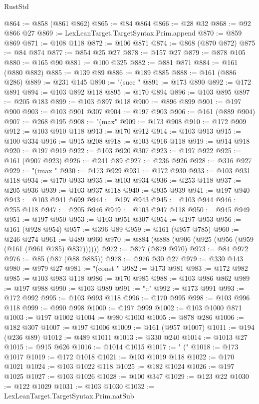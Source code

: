 \begin{lexlean}{RustStd}
\begin{coremodule}
{\begin{coremodule}
{{{{{{{{{{{{{{{{{{{{{{{{{{@864 := @858 (@861 @862)
@865 := @84 @864
@866 := @28 @32
@868 := @92 @866 @27
@869 := LexLeanTarget.TargetSyntax.Prim.append
@870 := @859 @869
@871 := @108 @118
@872 := @106 @871
@874 := @868 (@870 @872)
@875 := @84 @874
@877 := @854 @25 @27
@878 := @157 @27
@879 := @878 @105
@880 := @165 @90
@881 := @100 @325
@882 := @881 @871
@884 := @161 (@880 @882)
@885 := @139 @89
@886 := @189 @885
@888 := @161 (@886 @286)
@889 := @231 @145
@890 := "(succ "
@891 := @173 @890
@892 := @172 @891
@894 := @103 @892 @118
@895 := @170 @894
@896 := @103 @895
@897 := @205 @183
@899 := @103 @897 @118
@900 := @896 @899
@901 := @197 @900
@903 := @103 @901 @307
@904 := @197 @903
@906 := @161 (@889 @904)
@907 := @268 @195
@908 := "(max"
@909 := @173 @908
@910 := @172 @909
@912 := @103 @910 @118
@913 := @170 @912
@914 := @103 @913
@915 := @100 @334
@916 := @915 @208
@918 := @103 @916 @118
@919 := @914 @918
@920 := @197 @919
@922 := @103 @920 @307
@923 := @197 @922
@925 := @161 (@907 @923)
@926 := @241 @89
@927 := @236 @926
@928 := @316 @927
@929 := "(imax "
@930 := @173 @929
@931 := @172 @930
@933 := @103 @931 @118
@934 := @170 @933
@935 := @103 @934
@936 := @253 @118
@937 := @205 @936
@939 := @103 @937 @118
@940 := @935 @939
@941 := @197 @940
@943 := @103 @941 @699
@944 := @197 @943
@945 := @103 @944
@946 := @255 @118
@947 := @205 @946
@949 := @103 @947 @118
@950 := @945 @949
@951 := @197 @950
@953 := @103 @951 @307
@954 := @197 @953
@956 := @161 (@928 @954)
@957 := @396 @89
@959 := @161 (@957 @785)
@960 := @246 @274
@961 := @489 @960
@970 := @884 (@888 (@906 (@925 (@956 (@959 (@161 (@961 @785) @837))))))
@972 := @877 (@879 @970)
@973 := @84 @972
@976 := @85 (@87 (@88 @885))
@978 := @976 @30 @27
@979 := @330 @143
@980 := @979 @27
@981 := "(const "
@982 := @173 @981
@983 := @172 @982
@985 := @103 @983 @118
@986 := @170 @985
@988 := @103 @986 @862
@989 := @197 @988
@990 := @103 @989
@991 := "::"
@992 := @173 @991
@993 := @172 @992
@995 := @103 @993 @118
@996 := @170 @995
@998 := @103 @996 @118
@999 := @990 @998
@1000 := @197 @999
@1002 := @103 @1000 @871
@1003 := @197 @1002
@1004 := @980 @1003
@1005 := @878 @286
@1006 := @182 @307
@1007 := @197 @1006
@1009 := @161 (@957 @1007)
@1011 := @194 (@236 @89)
@1012 := @489 @1011
@1013 := @330 @240
@1014 := @1013 @27
@1015 := @915 @626
@1016 := @1014 @1015
@1017 := " ("
@1018 := @173 @1017
@1019 := @172 @1018
@1021 := @103 @1019 @118
@1022 := @170 @1021
@1024 := @103 @1022 @118
@1025 := @182 @1024
@1026 := @197 @1025
@1027 := @103 @1026
@1028 := @100 @347
@1029 := @123 @22
@1030 := @122 @1029
@1031 := @103 @1030
@1032 := LexLeanTarget.TargetSyntax.Prim.natSub
}}}}}}}}}}}}}}}}}}}}}}}}}}
\end{coremodule}}
\end{coremodule}
\end{lexlean}
